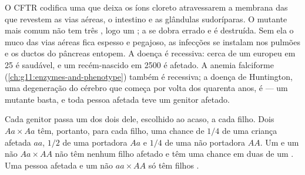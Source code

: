 \begin{example}\label{ex:g11:genes-and-disease:cf}
O  CFTR codifica uma  que deixa os íons cloreto
atravessarem a membrana das  que revestem as vias aéreas, o
intestino e as glândulas sudoríparas. O  mutante mais comum não
tem três , logo um ; a  se dobra errado e
é destruída. Sem ela o muco das vias aéreas fica espesso e pegajoso,
as infecções se instalam nos pulmões e os ductos do pâncreas entopem. A
doença é recessiva: cerca de um europeu em 25 é  saudável, e um
recém-nascido em 2500 é afetado. A anemia falciforme
(\cref{ch:g11:enzymes-and-phenotype}) também é recessiva; a doença de
Huntington, uma degeneração do cérebro que começa por volta dos
quarenta anos, é  --- um  mutante basta, e toda pessoa
afetada teve um genitor afetado.
\end{example}

\begin{proposition}\label{prop:g11:genes-and-disease:recessive}
Cada genitor passa um dos dois  dele, escolhido ao acaso, a cada
filho. Dois  $Aa \times Aa$ têm, portanto, para cada filho,
uma chance de $1/4$ de uma criança afetada $aa$, $1/2$ de uma portadora
$Aa$ e $1/4$ de uma não portadora $AA$. Um  e um não 
$Aa \times AA$ não têm nenhum filho afetado e têm uma chance em duas de
um . Uma pessoa afetada e um não  $aa \times AA$ só têm
filhos .
\end{proposition}
\admitted

